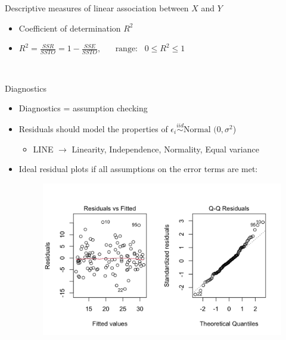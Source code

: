 \documentclass{article}
\newcommand{\followsp}[2]{\overset{#1}\sim \text{#2}\,}		%
\begin{document}
Descriptive measures of linear association between $X$ and $Y$
\begin{itemize}
    \item Coefficient of determination $R^2$
    \item[] $\displaystyle R^2 = \frac{SSR}{SSTO} = 1-\frac{SSE}{SSTO}, \hspace{20pt} \text{range:} \hspace{10pt} 0 \le R^2 \le 1$
\end{itemize}\
\newpage

Diagnostics
\begin{itemize}
    \item Diagnostics = assumption checking
    \item[] Residuals should model the properties of $\epsilon_i \followsp{iid}{Normal}\,(0, \sigma^2$)
    \begin{itemize}
        \item LINE $\rightarrow$ Linearity, Independence, Normality, Equal variance
    \end{itemize}
    \item Ideal residual plots if all assumptions on the error terms are met: 
    \begin{figure}[H]
        \center\includegraphics[scale=0.25]{images/ideal-diagnostics.png}
    \end{figure}
\end{itemize}\bigskip

\end{document}
